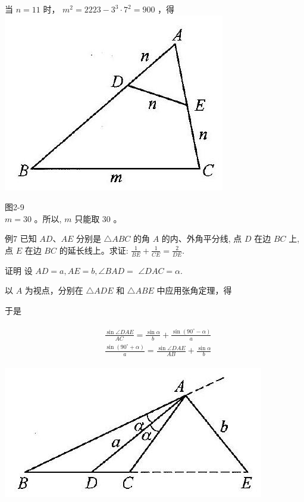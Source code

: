 \documentclass[10pt]{article}
\begin{document}
当 $n=11$ 时， $m^{2}=2223-3^{3} \cdot 7^{2}=900$ ，得\\
\includegraphics[max width=\textwidth, center]{2024_10_30_2c8f45efd4a519b08e1ag-021(1)}

图2-9\\
$m=30$ 。所以, $m$ 只能取 30 。

例7 已知 $A D 、 A E$ 分别是 $\triangle A B C$ 的角 $A$ 的内、外角平分线, 点 $D$ 在边 $B C$ 上, 点 $E$ 在边 $B C$ 的延长线上。求证: $\frac{1}{B E}+\frac{1}{C E}=\frac{2}{D E}$.

证明 设 $A D=a, A E=b, \angle B A D=$ $\angle D A C=\alpha$.

以 $A$ 为视点，分别在 $\triangle A D E$ 和 $\triangle A B E$ 中应用张角定理，得

于是

\begin{align*}
\begin{aligned}
& \frac{\sin \angle D A E}{A C}=\frac{\sin \alpha}{b}+\frac{\sin \left(90^{\circ}-\alpha\right)}{a} \\
& \frac{\sin \left(90^{\circ}+\alpha\right)}{a}=\frac{\sin \angle D A E}{A B}+\frac{\sin \alpha}{b}
\end{aligned}
\end{align*}

\begin{center}
\includegraphics[max width=\textwidth]{2024_10_30_2c8f45efd4a519b08e1ag-021}
\end{center}
\end{document}
